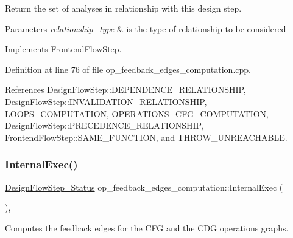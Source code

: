 Return the set of analyses in relationship with this design step. 


\begin{DoxyParams}{Parameters}
{\em relationship\+\_\+type} & is the type of relationship to be considered \\
\hline
\end{DoxyParams}


Implements \hyperlink{classFrontendFlowStep_abeaff70b59734e462d347ed343dd700d}{Frontend\+Flow\+Step}.



Definition at line 76 of file op\+\_\+feedback\+\_\+edges\+\_\+computation.\+cpp.



References Design\+Flow\+Step\+::\+D\+E\+P\+E\+N\+D\+E\+N\+C\+E\+\_\+\+R\+E\+L\+A\+T\+I\+O\+N\+S\+H\+IP, Design\+Flow\+Step\+::\+I\+N\+V\+A\+L\+I\+D\+A\+T\+I\+O\+N\+\_\+\+R\+E\+L\+A\+T\+I\+O\+N\+S\+H\+IP, L\+O\+O\+P\+S\+\_\+\+C\+O\+M\+P\+U\+T\+A\+T\+I\+ON, O\+P\+E\+R\+A\+T\+I\+O\+N\+S\+\_\+\+C\+F\+G\+\_\+\+C\+O\+M\+P\+U\+T\+A\+T\+I\+ON, Design\+Flow\+Step\+::\+P\+R\+E\+C\+E\+D\+E\+N\+C\+E\+\_\+\+R\+E\+L\+A\+T\+I\+O\+N\+S\+H\+IP, Frontend\+Flow\+Step\+::\+S\+A\+M\+E\+\_\+\+F\+U\+N\+C\+T\+I\+ON, and T\+H\+R\+O\+W\+\_\+\+U\+N\+R\+E\+A\+C\+H\+A\+B\+LE.

\mbox{\label{classop__feedback__edges__computation_aea1d74075f6fed53eaf6b8829ec400e1}} 
\subsubsection{\texorpdfstring{Internal\+Exec()}{InternalExec()}}
{\footnotesize\ttfamily \hyperlink{design__flow__step_8hpp_afb1f0d73069c26076b8d31dbc8ebecdf}{Design\+Flow\+Step\+\_\+\+Status} op\+\_\+feedback\+\_\+edges\+\_\+computation\+::\+Internal\+Exec (\begin{DoxyParamCaption}{ }\end{DoxyParamCaption})\hspace{0.3cm}{\ttfamily [override]}, {\ttfamily [virtual]}}



Computes the feedback edges for the C\+FG and the C\+DG operations graphs. 

